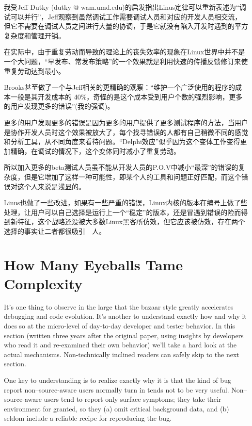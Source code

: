 \documentclass[a4paper,12pt,UTF8,twoside]{ctexbook}
\begin{document}
我受Jeff Dutky (dutky @ wam.umd.edu)的启发指出Linus定律可以重新表述为“调试可以并行”，Jeff观察到虽然调试工作需要调试人员和对应的开发人员相交流，但它不需要在调试人员之间进行大量的协调，于是它就没有陷入开发时遇到的平方复杂度和管理开销。

在实际中，由于重复劳动而导致的理论上的丧失效率的现象在Linux世界中并不是一个大问题，“早发布、常发布策略”的一个效果就是利用快速的传播反馈修订来使重复劳动达到最小。

Brooks甚至做了一个与Jeff相关的更精确的观察：“维护一个广泛使用的程序的成本一般是其开发成本的 40\%，奇怪的是这个成本受到用户个数的强烈影响，更多的用户发现更多的错误”(我的强调)。


更多的用户发现更多的错误是因为更多的用户提供了更多测试程序的方法，当用户是协作开发人员时这个效果被放大了，每个找寻错误的人都有自己稍微不同的感觉和分析工具，从不同角度来看待问题。“Delphi效应”似乎因为这个变体工作变得更加精确，在调试的情况下，这个变体同时减小了重复劳动。


所以加入更多的beta测试人员虽不能从开发人员的P.O.V中减小“最深”的错误的复杂度，但是它增加了这样一种可能性，即某个人的工具和问题正好匹配，而这个错误对这个人来说是浅显的。


Linus也做了一些改进，如果有一些严重的错误，Linux内核的版本在编号上做了些处理，让用户可以自己选择是运行上一个“稳定”的版本，还是冒遇到错误的险而得到新特征，这个战略还没被大多数Linux黑客所仿效，但它应该被仿效，存在两个选择的事实让二者都很吸引　人。

\chapter{How Many Eyeballs Tame Complexity}

It's one thing to observe in the large that the bazaar style greatly accelerates debugging and code evolution. It's another to understand exactly how and why it does so at the micro-level of day-to-day developer and tester behavior. In this section (written three years after the original paper, using insights by developers who read it and re-examined their own behavior) we'll take a hard look at the actual mechanisms. Non-technically inclined readers can safely skip to the next section.

One key to understanding is to realize exactly why it is that the kind of bug report non–source-aware users normally turn in tends not to be very useful. Non–source-aware users tend to report only surface symptoms; they take their environment for granted, so they (a) omit critical background data, and (b) seldom include a reliable recipe for reproducing the bug.
\end{document}
